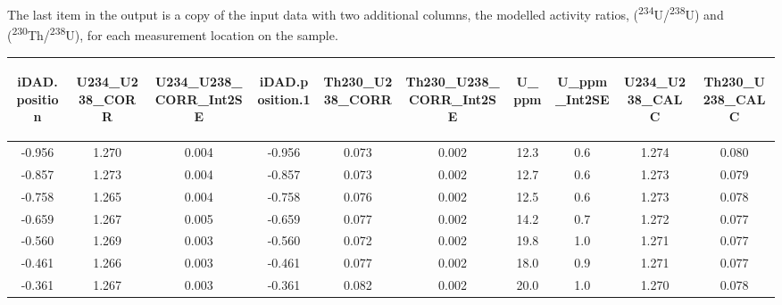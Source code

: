 \documentclass[]{elsarticle} %
\begin{document}
The last item in the output is a copy of the input data with two additional columns, the modelled activity ratios, (\textsuperscript{234}U/\textsuperscript{238}U) and (\textsuperscript{230}Th/\textsuperscript{238}U), for each measurement location on the sample.

\begin{table}[ht]
\centering
\begin{tabular}{cccccccccc}
  \hline
\begin{sideways} iDAD.position \end{sideways} & \begin{sideways} U234\_U238\_CORR \end{sideways} & \begin{sideways} U234\_U238\_CORR\_Int2SE \end{sideways} & \begin{sideways} iDAD.position.1 \end{sideways} & \begin{sideways} Th230\_U238\_CORR \end{sideways} & \begin{sideways} Th230\_U238\_CORR\_Int2SE \end{sideways} & \begin{sideways} U\_ppm \end{sideways} & \begin{sideways} U\_ppm\_Int2SE \end{sideways} & \begin{sideways} U234\_U238\_CALC \end{sideways} & \begin{sideways} Th230\_U238\_CALC \end{sideways} \\ 
  \hline
-0.956 & 1.270 & 0.004 & -0.956 & 0.073 & 0.002 & 12.3 & 0.6 & 1.274 & 0.080 \\ 
  -0.857 & 1.273 & 0.004 & -0.857 & 0.073 & 0.002 & 12.7 & 0.6 & 1.273 & 0.079 \\ 
  -0.758 & 1.265 & 0.004 & -0.758 & 0.076 & 0.002 & 12.5 & 0.6 & 1.273 & 0.078 \\ 
  -0.659 & 1.267 & 0.005 & -0.659 & 0.077 & 0.002 & 14.2 & 0.7 & 1.272 & 0.077 \\ 
  -0.560 & 1.269 & 0.003 & -0.560 & 0.072 & 0.002 & 19.8 & 1.0 & 1.271 & 0.077 \\ 
  -0.461 & 1.266 & 0.003 & -0.461 & 0.077 & 0.002 & 18.0 & 0.9 & 1.271 & 0.077 \\ 
  -0.361 & 1.267 & 0.003 & -0.361 & 0.082 & 0.002 & 20.0 & 1.0 & 1.270 & 0.078 \\ 

\end{tabular}
\end{table}
\end{document}
